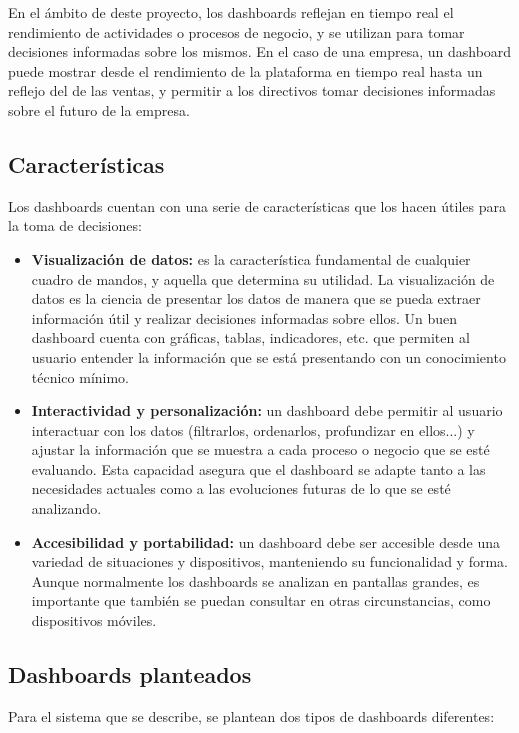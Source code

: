 En el ámbito de deste proyecto, los dashboards reflejan en tiempo real el rendimiento de
actividades o procesos de negocio, y se utilizan para tomar decisiones informadas sobre los
mismos. En el caso de una empresa, un dashboard puede mostrar desde el rendimiento de la
plataforma en tiempo real hasta un reflejo del de las ventas, y permitir a los directivos tomar
decisiones informadas sobre el futuro de la empresa.

\subsection{Características}
Los dashboards cuentan con una serie de características que los hacen útiles para la toma de
decisiones:

\begin{itemize}
	\item \textbf{Visualización de datos:} es la característica fundamental de cualquier
		cuadro de mandos, y aquella que determina su utilidad. La visualización de datos
		es la ciencia de presentar los datos de manera que se pueda extraer información útil
		y realizar decisiones informadas sobre ellos. Un buen dashboard cuenta con gráficas,
		tablas, indicadores, etc. que permiten al usuario entender la información que se
		está presentando con un conocimiento técnico mínimo.
	\item \textbf{Interactividad y personalización:} un dashboard debe permitir al usuario
		interactuar con los datos (filtrarlos, ordenarlos, profundizar en ellos...) y ajustar
		la información que se muestra a cada proceso o negocio que se esté evaluando.
		Esta capacidad asegura que el dashboard se adapte tanto a las necesidades actuales
		como a las evoluciones futuras de lo que se esté analizando.
	\item \textbf{Accesibilidad y portabilidad:} un dashboard debe ser accesible desde una
		variedad de situaciones y dispositivos, manteniendo su funcionalidad y forma. Aunque
		normalmente los dashboards se analizan en pantallas grandes, es importante que también
		se puedan consultar en otras circunstancias, como dispositivos móviles.
\end{itemize}

\newpage{}
\subsection{Dashboards planteados}
Para el sistema que se describe, se plantean dos tipos de dashboards diferentes:

